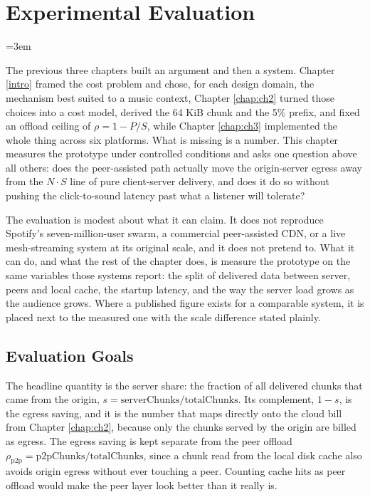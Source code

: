 \chapter{Experimental Evaluation}
\label{chap:ch4}

\emergencystretch=3em

\indent \par The previous three chapters built an argument and then a system. Chapter \ref{intro} framed the cost problem and chose, for each design domain, the mechanism best suited to a music context, Chapter \ref{chap:ch2} turned those choices into a cost model, derived the 64 KiB chunk and the 5\% prefix, and fixed an offload ceiling of $\rho = 1 - P/S$, while Chapter \ref{chap:ch3} implemented the whole thing across six platforms. What is missing is a number. This chapter measures the prototype under controlled conditions and asks one question above all others: does the peer-assisted path actually move the origin-server egress away from the $N \cdot S$ line of pure client-server delivery, and does it do so without pushing the click-to-sound latency past what a listener will tolerate?

\par The evaluation is modest about what it can claim. It does not reproduce Spotify's seven-million-user swarm, a commercial peer-assisted CDN, or a live mesh-streaming system at its original scale, and it does not pretend to. What it can do, and what the rest of the chapter does, is measure the prototype on the same variables those systems report: the split of delivered data between server, peers and local cache, the startup latency, and the way the server load grows as the audience grows. Where a published figure exists for a comparable system, it is placed next to the measured one with the scale difference stated plainly.

\section{Evaluation Goals}
\label{sec:eval-goals}

\indent \par The headline quantity is the server share: the fraction of all delivered chunks that came from the origin, $s = \text{serverChunks} / \text{totalChunks}$. Its complement, $1 - s$, is the egress saving, and it is the number that maps directly onto the cloud bill from Chapter \ref{chap:ch2}, because only the chunks served by the origin are billed as egress. The egress saving is kept separate from the peer offload $\rho_{\text{p2p}} = \text{p2pChunks}/\text{totalChunks}$, since a chunk read from the local disk cache also avoids origin egress without ever touching a peer. Counting cache hits as peer offload would make the peer layer look better than it really is.

